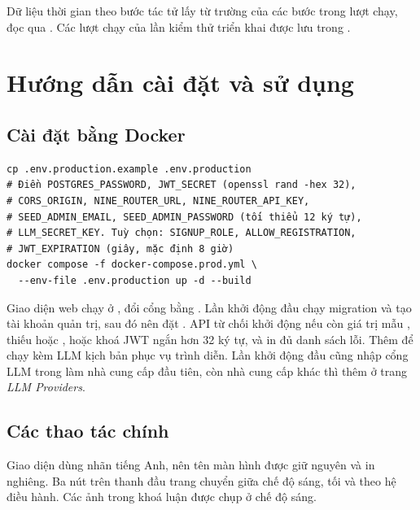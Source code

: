 Dữ liệu thời gian theo bước tác tử lấy từ trường  của các bước trong lượt chạy, đọc qua . Các lượt chạy của lần kiểm thử triển khai được lưu trong .

\chapter{Hướng dẫn cài đặt và sử dụng}
\label{app:huong-dan}

\section{Cài đặt bằng Docker}

\begin{Verbatim}
cp .env.production.example .env.production
# Điền POSTGRES_PASSWORD, JWT_SECRET (openssl rand -hex 32),
# CORS_ORIGIN, NINE_ROUTER_URL, NINE_ROUTER_API_KEY,
# SEED_ADMIN_EMAIL, SEED_ADMIN_PASSWORD (tối thiểu 12 ký tự),
# LLM_SECRET_KEY. Tuỳ chọn: SIGNUP_ROLE, ALLOW_REGISTRATION,
# JWT_EXPIRATION (giây, mặc định 8 giờ)
docker compose -f docker-compose.prod.yml \
  --env-file .env.production up -d --build
\end{Verbatim}

Giao diện web chạy ở , đổi cổng bằng . Lần khởi động đầu chạy migration và tạo tài khoản quản trị, sau đó nên đặt . API từ chối khởi động nếu còn giá trị mẫu , thiếu  hoặc , hoặc khoá JWT ngắn hơn 32 ký tự, và in đủ danh sách lỗi. Thêm  để chạy kèm LLM kịch bản phục vụ trình diễn. Lần khởi động đầu cũng nhập cổng LLM trong  làm nhà cung cấp đầu tiên, còn nhà cung cấp khác thì thêm ở trang \textit{LLM Providers}.

\section{Các thao tác chính}

Giao diện dùng nhãn tiếng Anh, nên tên màn hình được giữ nguyên và in nghiêng. Ba nút trên thanh đầu trang chuyển giữa chế độ sáng, tối và theo hệ điều hành. Các ảnh trong khoá luận được chụp ở chế độ sáng.

